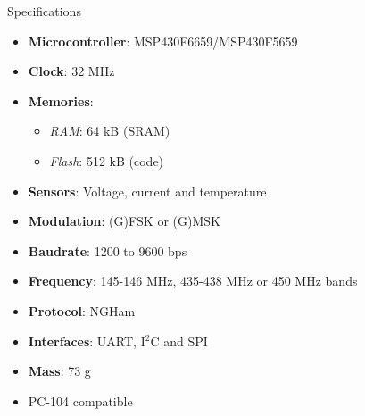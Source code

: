 %
%
%
%
%

%
%
%
%
%


\begin{frame}{Specifications}

    \begin{itemize}
        \item \textbf{Microcontroller}: MSP430F6659/MSP430F5659
        \item \textbf{Clock}: 32 MHz
        \item \textbf{Memories}:
        \begin{itemize}
            \item \textit{RAM}: 64 kB (SRAM)
            \item \textit{Flash}: 512 kB (code)
        \end{itemize}
        \item \textbf{Sensors}: Voltage, current and temperature
        \item \textbf{Modulation}: (G)FSK or (G)MSK
        \item \textbf{Baudrate}: 1200 to 9600 bps
        \item \textbf{Frequency}: 145-146 MHz, 435-438 MHz or 450 MHz bands
        \item \textbf{Protocol}: NGHam
        \item \textbf{Interfaces}: UART, I$^{2}$C and SPI
        \item \textbf{Mass}: 73 g
        \item PC-104 compatible
    \end{itemize}

\end{frame}


